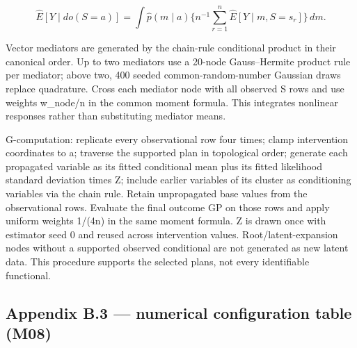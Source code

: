 \[
\widehat E[Y\mid do(S=a)]=\int \widehat p(m\mid a)\Big\{n^{-1}\sum_{r=1}^n\widehat E[Y\mid m,S=s_r]\Big\}\,dm.
\]

Vector mediators are generated by the chain-rule conditional product in their canonical order. Up to two mediators use a 20-node Gauss--Hermite product rule per mediator; above two, 400 seeded common-random-number Gaussian draws replace quadrature. Cross each mediator node with all observed S rows and use weights w\_node/n in the common moment formula. This integrates nonlinear responses rather than substituting mediator means.

G-computation: replicate every observational row four times; clamp intervention coordinates to a; traverse the supported plan in topological order; generate each propagated variable as its fitted conditional mean plus its fitted likelihood standard deviation times Z; include earlier variables of its cluster as conditioning variables via the chain rule. Retain unpropagated base values from the observational rows. Evaluate the final outcome GP on those rows and apply uniform weights 1/(4n) in the same moment formula. Z is drawn once with estimator seed 0 and reused across intervention values. Root/latent-expansion nodes without a supported observed conditional are not generated as new latent data. This procedure supports the selected plans, not every identifiable functional.

\subsection*{Appendix B.3 --- numerical configuration table (M08)}

